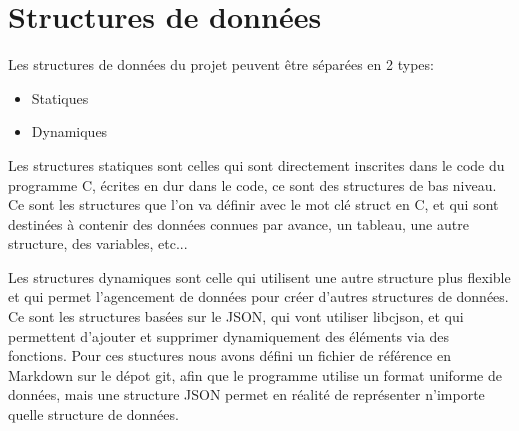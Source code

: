 % 
\section{Structures de données}
Les structures de données du projet peuvent être séparées en 2 types:
\begin{itemize}
	\item Statiques
	\item Dynamiques
\end{itemize}
Les structures statiques sont celles qui sont directement inscrites dans le code du programme C, écrites en dur dans le code, ce sont des structures de bas niveau. Ce sont les structures que l'on va définir avec le mot clé struct en C, et qui sont destinées à contenir des données connues par avance, un tableau, une autre structure, des variables, etc...\par
Les structures dynamiques sont celle qui utilisent une autre structure plus flexible et qui permet l'agencement de données pour créer d'autres structures de données. Ce sont les structures basées sur le JSON, qui vont utiliser libcjson, et qui permettent d'ajouter et supprimer dynamiquement des éléments via des fonctions. Pour ces stuctures nous avons défini un fichier de référence en Markdown sur le dépot git, afin que le programme utilise un format uniforme de données, mais une structure JSON permet en réalité de représenter n'importe quelle structure de données.\par
% 
